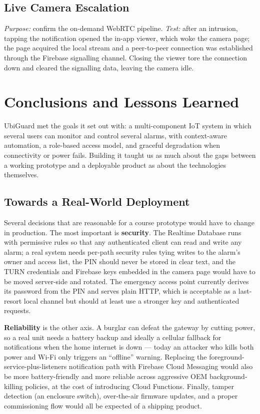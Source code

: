 \documentclass[10pt,twocolumn]{article}
\begin{document}
\subsection{Live Camera Escalation}
\emph{Purpose:} confirm the on-demand WebRTC pipeline. \emph{Test:} after an intrusion, tapping the notification opened the in-app viewer, which woke the camera page; the page acquired the local stream and a peer-to-peer connection was established through the Firebase signalling channel. Closing the viewer tore the connection down and cleared the signalling data, leaving the camera idle.

\section{Conclusions and Lessons Learned}
UbiGuard met the goals it set out with: a multi-component IoT system in which several users can monitor and control several alarms, with context-aware automation, a role-based access model, and graceful degradation when connectivity or power fails. Building it taught us as much about the gaps between a working prototype and a deployable product as about the technologies themselves.

\subsection{Towards a Real-World Deployment}
Several decisions that are reasonable for a course prototype would have to change in production. The most important is \textbf{security}. The Realtime Database runs with permissive rules so that any authenticated client can read and write any alarm; a real system needs per-path security rules tying writes to the alarm's owner and access list, the PIN should never be stored in clear text, and the TURN credentials and Firebase keys embedded in the camera page would have to be moved server-side and rotated. The emergency access point currently derives its password from the PIN and serves plain HTTP, which is acceptable as a last-resort local channel but should at least use a stronger key and authenticated requests.

\textbf{Reliability} is the other axis. A burglar can defeat the gateway by cutting power, so a real unit needs a battery backup and ideally a cellular fallback for notifications when the home internet is down --- today an attacker who kills both power and Wi-Fi only triggers an ``offline'' warning. Replacing the foreground-service-plus-listeners notification path with Firebase Cloud Messaging would also be more battery-friendly and more reliable across aggressive OEM background-killing policies, at the cost of introducing Cloud Functions. Finally, tamper detection (an enclosure switch), over-the-air firmware updates, and a proper commissioning flow would all be expected of a shipping product.
\end{document}
